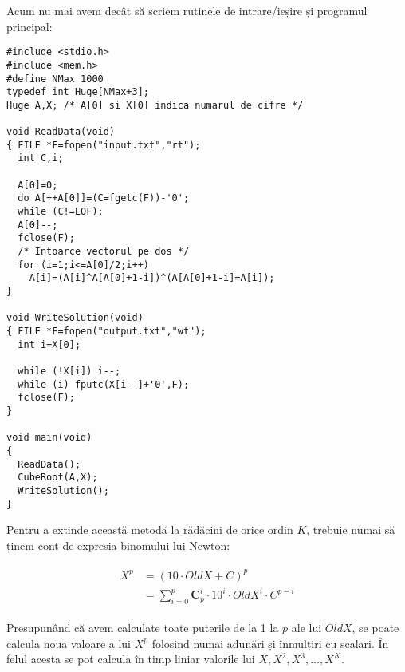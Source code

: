 Acum nu mai avem decât să scriem rutinele de intrare/ieșire și programul
principal:

\begin{verbatim}
#include <stdio.h>
#include <mem.h>
#define NMax 1000
typedef int Huge[NMax+3];
Huge A,X; /* A[0] si X[0] indica numarul de cifre */

void ReadData(void)
{ FILE *F=fopen("input.txt","rt");
  int C,i;

  A[0]=0;
  do A[++A[0]]=(C=fgetc(F))-'0';
  while (C!=EOF);
  A[0]--;
  fclose(F);
  /* Intoarce vectorul pe dos */
  for (i=1;i<=A[0]/2;i++)
    A[i]=(A[i]^A[A[0]+1-i])^(A[A[0]+1-i]=A[i]);
}

void WriteSolution(void)
{ FILE *F=fopen("output.txt","wt");
  int i=X[0];

  while (!X[i]) i--;
  while (i) fputc(X[i--]+'0',F);
  fclose(F);
}

void main(void)
{
  ReadData();
  CubeRoot(A,X);
  WriteSolution();
}
\end{verbatim}

Pentru a extinde această metodă la rădăcini de orice ordin $K$, trebuie numai
să ținem cont de expresia binomului lui Newton:

\begin{align}
  \begin{split}
    X^p & = (10 \cdot OldX + C)^p \\
    & = \sum_{i=0}^{p} \mathbf{C}_p^i \cdot 10^i \cdot OldX^i \cdot C^{p-i}
  \end{split}
\end{align}

Presupunând că avem calculate toate puterile de la 1 la $p$ ale lui $OldX$, se
poate calcula noua valoare a lui $X^p$ folosind numai adunări și înmulțiri cu
scalari. În felul acesta se pot calcula în timp liniar valorile lui $X, X^2,
X^3, \dots, X^K.$
